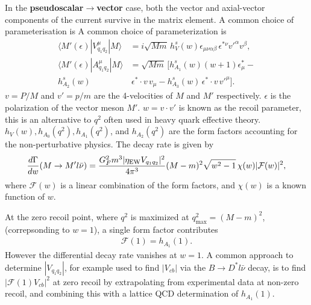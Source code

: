 In the {\bf{pseudoscalar$\to$vector}} case, both the vector and axial-vector components of the current survive in the matrix element. A common choice of parameterisation is
A common choice of parameterization is
\begin{align}
  \langle M'(\epsilon)| V_{q_1q_2}^{\mu} | M \rangle &= i \sqrt{Mm}\, h^s_V(w) \epsilon_{\mu\nu\alpha\beta} \,\epsilon^{*\nu} v'^{\alpha} v^{\beta}, \\
  \langle M'(\epsilon)| A_{q_1q_2}^{\mu} | M \rangle &= \sqrt{Mm} \, [ h^s_{A_1}(w) (w+1) \epsilon^*_{\mu} - \\ \nonumber
    h^s_{A_2}(w)& \,\epsilon^*\cdot v \,v_{\mu} - h^s_{A_3}(w) \,\epsilon^*\cdot v \, v'^{\mu} ].
\end{align}
$v = P/M$ and $v' = p/m$ are the 4-velocities of $M$ and $M'$ respectively. $\epsilon$ is the polarization of the vector meson $M'$. $w = v\cdot v'$ is known as the recoil parameter, this is an alternative to $q^2$ often used in heavy quark effective theory. $h_V(w),h_{A_0}(q^2),h_{A_1}(q^2)$, and $h_{A_2}(q^2)$ are the form factors accounting for the non-perturbative physics. The decay rate is given by
\begin{align}
  {d\Gamma \over dw}(M\to M' l\bar{\nu}) = {G_F^2 m^3 | \eta_{\text{EW}} V_{q_1q_2} |^2 \over 4\pi^3 } (M-m)^2 \sqrt{w^2-1} \, \chi(w) |\mathcal{F}(w)|^2,
\end{align}
where $\mathcal{F}(w)$ is a linear combination of the form factors, and $\chi(w)$ is a known function of $w$.

At the zero recoil point, where $q^2$ is maximized at $q^2_{\text{max}} = (M-m)^2$, (correpsonding to $w=1$), a single form factor contributes
\begin{align}
  \mathcal{F}(1) = h_{A_1}(1).
\end{align}
However the differential decay rate vanishes at $w=1$. A common approach to determine $|V_{q_1q_2}|$, for example used to find $|V_{cb}|$ via the $B\to D^*l\bar{\nu}$ decay, is to find $|\mathcal{F}(1)V_{cb}|^2$ at zero recoil by extrapolating from experimental data at non-zero recoil, and combining this with a lattice QCD determination of $h_{A_1}(1)$.

